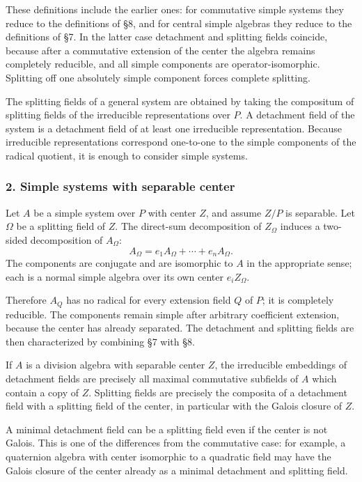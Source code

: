 \documentclass[
  11pt,
]{article}
\begin{document}
These definitions include the earlier ones: for commutative simple
systems they reduce to the definitions of §8, and for central simple
algebras they reduce to the definitions of §7. In the latter case
detachment and splitting fields coincide, because after a commutative
extension of the center the algebra remains completely reducible, and
all simple components are operator-isomorphic. Splitting off one
absolutely simple component forces complete splitting.

The splitting fields of a general system are obtained by taking the
compositum of splitting fields of the irreducible representations over
\(P\). A detachment field of the system is a detachment field of at
least one irreducible representation. Because irreducible
representations correspond one-to-one to the simple components of the
radical quotient, it is enough to consider simple systems.

\subsubsection{2. Simple systems with separable
center}\label{simple-systems-with-separable-center}

Let \(A\) be a simple system over \(P\) with center \(Z\), and assume
\(Z/P\) is separable. Let \(\Omega\) be a splitting field of \(Z\). The
direct-sum decomposition of \(Z_\Omega\) induces a two-sided
decomposition of \(A_\Omega\): \[
  A_\Omega=e_1A_\Omega+\cdots+e_nA_\Omega.
\] The components are conjugate and are isomorphic to \(A\) in the
appropriate sense; each is a normal simple algebra over its own center
\(e_iZ_\Omega\).

Therefore \(A_Q\) has no radical for every extension field \(Q\) of
\(P\); it is completely reducible. The components remain simple after
arbitrary coefficient extension, because the center has already
separated. The detachment and splitting fields are then characterized by
combining §7 with §8.

If \(A\) is a division algebra with separable center \(Z\), the
irreducible embeddings of detachment fields are precisely all maximal
commutative subfields of \(A\) which contain a copy of \(Z\). Splitting
fields are precisely the composita of a detachment field with a
splitting field of the center, in particular with the Galois closure of
\(Z\).

A minimal detachment field can be a splitting field even if the center
is not Galois. This is one of the differences from the commutative case:
for example, a quaternion algebra with center isomorphic to a quadratic
field may have the Galois closure of the center already as a minimal
detachment and splitting field.
\end{document}
